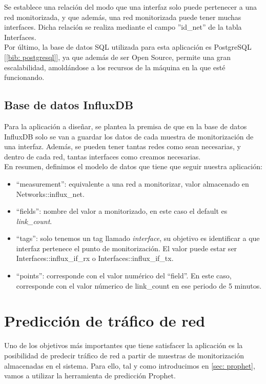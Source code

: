 \documentclass[a4paper, oneside, 12pt]{book}
\begin{document}
	\noindent Se establece una relación del modo que una interfaz solo puede pertenecer a una red monitorizada, y que además, una red monitorizada puede tener muchas interfaces. Dicha relación se realiza mediante el campo ''id\_net'' de la tabla Interfaces. \\
	
	\noindent Por último, la base de datos SQL utilizada para esta aplicación es PostgreSQL [\ref{bib: postgresql}], ya que además de ser Open Source, permite una gran escalabilidad, amoldándose a los recursos de la máquina en la que esté funcionando.
	
	\subsection{Base de datos InfluxDB}
	
	\noindent Para la aplicación a diseñar, se plantea la premisa de que en la base de datos InfluxDB solo se van a guardar los datos de cada muestra de monitorización de una interfaz. Además, se pueden tener tantas redes como sean necesarias, y dentro de cada red, tantas interfaces como creamos necesarias. \\
	
	\noindent En resumen, definimos el modelo de datos que tiene que seguir nuestra aplicación:
	
	\begin{itemize}
		\item ``measurement'': equivalente a una red a monitorizar, valor almacenado en Networks::influx\_net.
		\item ``fields'': nombre del valor a monitorizado, en este caso el default es \textit{link\_count}.
		\item ``tags'': solo tenemos un tag llamado \textit{interface}, su objetivo es identificar a que interfaz pertenece el punto de monitorización. El valor puede estar ser Interfaces::influx\_if\_rx o Interfaces::influx\_if\_tx.
		\item ``points'': corresponde con el valor numérico del ``field''. En este caso, corresponde con el valor númerico de link\_count en ese periodo de 5 minutos.
	\end{itemize}

	\section{Predicción de tráfico de red}
	\label{sec: prophet info}
	
	\noindent Uno de los objetivos más importantes que tiene satisfacer la aplicación es la posibilidad de predecir tráfico de red a partir de muestras de monitorización almacenadas en el sistema. Para ello, tal y como introducimos en \ref{sec: prophet}, vamos a utilizar la herramienta de predicción Prophet. \\
	
\end{document}
